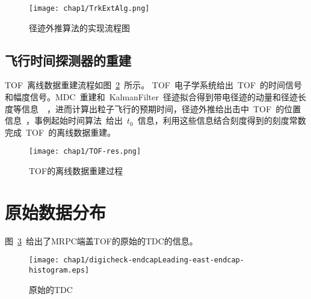 \begin{figure}[!h]
  \centering
  \texttt{[image: chap1/TrkExtAlg.png]}
  \caption{径迹外推算法的实现流程图}
  \label{fig:TrkExtAlg}
\end{figure}

\subsection{飞行时间探测器的重建}
TOF~离线数据重建流程如图~\ref{fig:TOF-res}~所示。
TOF~电子学系统给出~TOF~的时间信号和幅度信号。MDC~重建和~KalmanFilter~径迹拟合得到带电径迹的动量和径迹长度等信息~\cite{wulh2007}~\cite{wangjk2009}，进而计算出粒子飞行的预期时间，径迹外推给出击中~TOF~的位置信息~\cite{wangll:2014}，事例起始时间算法~\cite{Maxiang:2008}给出~$t_{0}$~信息，利用这些信息结合刻度得到的刻度常数完成~TOF~的离线数据重建。
\begin{figure}[!h]
  \centering
  \texttt{[image: chap1/TOF-res.png]}
  \caption{TOF的离线数据重建过程}
  \label{fig:TOF-res}
\end{figure}

\section{原始数据分布}
图~\ref{fig:digicheck-endcapLeading-east-endcap-histogram}~给出了MRPC端盖TOF的原始的TDC的信息。
\begin{figure}[!h]
  \centering
  \texttt{[image: chap1/digicheck-endcapLeading-east-endcap-histogram.eps]}
  \caption{原始的TDC}
  \label{fig:digicheck-endcapLeading-east-endcap-histogram}
\end{figure}

